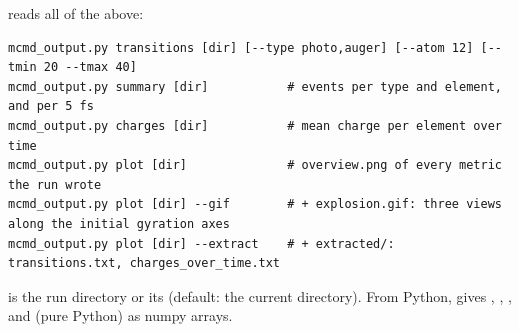  reads all of the above:
\begin{lstlisting}
mcmd_output.py transitions [dir] [--type photo,auger] [--atom 12] [--tmin 20 --tmax 40]
mcmd_output.py summary [dir]           # events per type and element, and per 5 fs
mcmd_output.py charges [dir]           # mean charge per element over time
mcmd_output.py plot [dir]              # overview.png of every metric the run wrote
mcmd_output.py plot [dir] --gif        # + explosion.gif: three views along the initial gyration axes
mcmd_output.py plot [dir] --extract    # + extracted/: transitions.txt, charges_over_time.txt
\end{lstlisting}
 is the run directory or its  (default: the current directory).
From Python,  gives , , ,
 and  (pure Python) as numpy arrays.

